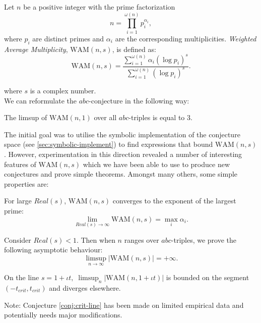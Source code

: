 \begin{definition}
    \label{def:wam}
    Let $n$ be a positive integer with the prime factorization 
    \[
    n = \prod_{i=1}^{\omega(n)} p_i^{\alpha_i},
    \]
    where $p_i$ are distinct primes and $\alpha_i$ are the corresponding multiplicities.
    \emph{Weighted Average Multiplicity}, $\text{WAM}(n, s)$, is defined as:
    \[
    \text{WAM}(n, s) = \frac{\sum_{i=1}^{\omega(n)} \alpha_i (\log p_i)^s}{\sum_{i=1}^{\omega(n)} (\log p_i)^s}.
    \]
\end{definition}
where $s$ is a complex number.
\\
We can reformulate the $abc$-conjecture in the following way:
\begin{conjecture}
    \label{abc_wam}
    The limsup of $\text{WAM}(n,1)$ over all $abc$-triples is equal to 3.
\end{conjecture}
The initial goal was to utilise the symbolic implementation of the conjecture space (see \ref{sec:symbolic-implement}) to find expressions that bound $\text{WAM}(n,s)$.
However, experimentation in this direction revealed a number of interesting features of $\text{WAM}(n,s)$ which we have been able to use to produce new conjectures and prove simple theorems.
Amongst many others, some simple properties are:

\begin{theorem}
    For large $Real(s)$, $\text{WAM}(n, s)$ converges to the exponent of the largest prime:
    \begin{equation*}
        \lim_{Real(s)\to\infty} \text{WAM}(n, s) = \max_i \alpha_i.
    \end{equation*}
\end{theorem} 
\begin{theorem}
    Consider $Real(s) < 1$. Then when $n$ ranges over $abc$-triples, we prove the following asymptotic behaviour:
    \begin{equation*}
        \limsup_{n\to\infty} |\text{WAM}(n, s)| = +\infty.
    \end{equation*}
\end{theorem} 
\begin{conjecture}
    \label{conj:crit-line}
    On the line $s = 1 + \iota t, \;\limsup_n|\text{WAM}(n, 1 + \iota t)|$ is bounded on the segment $(-t_{crit}, t_{crit})$ and diverges elsewhere.
\end{conjecture}
Note: Conjecture \ref{conj:crit-line} has been made on limited empirical data and potentially needs major modifications.

